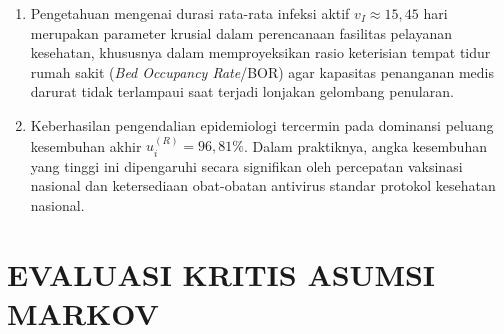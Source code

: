 \documentclass[12pt,a4paper]{article}
\numberwithin{equation}{section}
\begin{document}
\begin{enumerate}
  \item Pengetahuan mengenai durasi rata-rata infeksi aktif $v_I \approx 15{,}45$ hari merupakan parameter krusial dalam perencanaan fasilitas pelayanan kesehatan, khususnya dalam memproyeksikan rasio keterisian tempat tidur rumah sakit (\textit{Bed Occupancy Rate}/BOR) agar kapasitas penanganan medis darurat tidak terlampaui saat terjadi lonjakan gelombang penularan.
  \item Keberhasilan pengendalian epidemiologi tercermin pada dominansi peluang kesembuhan akhir $u_i^{(R)} = 96{,}81\%$. Dalam praktiknya, angka kesembuhan yang tinggi ini dipengaruhi secara signifikan oleh percepatan vaksinasi nasional dan ketersediaan obat-obatan antivirus standar protokol kesehatan nasional.
\end{enumerate}

\clearpage
\section{EVALUASI KRITIS ASUMSI MARKOV}
\thispagestyle{plain}
\end{document}
